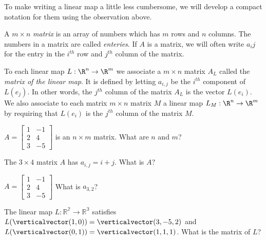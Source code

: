 	To make writing a linear map a little less cumbersome, we will develop a compact notation for them using the observation above. 
	
	\begin{definition}
		A $m \times n$ \textit{matrix} is an array of numbers which has $m$ rows and $n$ columns.  The numbers in a matrix are called \textit{enteries}. If $A$ is a matrix, 
		we will often write $a_ij$ for the entry in the $i^{th}$  row and $j^{th}$ column of the matrix.
	\end{definition}
	
	\begin{definition}
		To each linear map $L: \R^n \to \R^m$  we associate a $m \times n$ matrix $A_L$ called the \textit{matrix of the linear map}.  It is defined 
		by letting $a_{i,j}$ be the $i^{th}$ component of $L(e_j)$.  In other words, the $j^{th}$ column of the matrix $A_L$ is the vector $L(e_i)$.  We also associate to each 
		matrix $m \times n$ matrix $M$ a linear map $L_M: \R^n \to \R^m$ by requiring that $L(e_i)$ is the $j^{th}$ column of the matrix $M$. 
	\end{definition}
	
	\begin{question}
		$A = \begin{bmatrix}
		1&-1\\2&4\\3&-5
		\end{bmatrix}$
		is an $n \times m$ matrix.  What are $n$ and $m$? 
	\end{question}
	
	\begin{question}
		The $3 \times 4$ matrix $A$ has $a_{i,j} = i+j$.  What is $A$?
	\end{question}
	
	\begin{question}
		$A = \begin{bmatrix}
		1&-1\\2&4\\3&-5
		\end{bmatrix}$
		 What is $a_{3,2}$?
	\end{question}
	
	\begin{question}
		The linear map $L:\mathbb{R^2}\to\mathbb{R^3}$ satisfies $L(\verticalvector(1,0)) = \verticalvector(3,-5,2)$ and $L(\verticalvector(0,1)) = \verticalvector(1,1,1)$. 
		 What is the matrix of $L$?
	\end{question}
	
